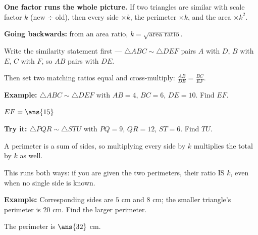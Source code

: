 \documentclass[12pt]{article}
\begin{document}

\begin{formulabox}
\textbf{One factor runs the whole picture.} If two triangles are similar with
scale factor $k$ (new $\div$ old), then every side $\times k$, the perimeter
$\times k$, and the area $\times k^2$.\par
\textbf{Going backwards:} from an area ratio, $k = \sqrt{\text{area ratio}}$.
\end{formulabox}


\begin{formulabox}
Write the similarity statement first --- $\triangle ABC \sim \triangle DEF$
pairs $A$ with $D$, $B$ with $E$, $C$ with $F$, so $AB$ pairs with $DE$.\par
Then set two matching ratios equal and cross-multiply:
$\frac{AB}{DE} = \frac{BC}{EF}$.
\end{formulabox}

\begin{examplebox}
\textbf{Example:} \quad $\triangle ABC \sim \triangle DEF$ with $AB = 4$,
$BC = 6$, $DE = 10$. Find $EF$.

$EF = \ans{15}$
\end{examplebox}

\begin{tryitbox}
\textbf{Try it:} \quad $\triangle PQR \sim \triangle STU$ with $PQ = 9$,
$QR = 12$, $ST = 6$. Find $TU$.\\[2pt]
\end{tryitbox}


\begin{formulabox}
A perimeter is a sum of sides, so multiplying every side by $k$ multiplies the
total by $k$ as well.\par
This runs both ways: if you are given the two perimeters, their ratio IS $k$,
even when no single side is known.
\end{formulabox}

\begin{examplebox}
\textbf{Example:} \quad Corresponding sides are $5$ cm and $8$ cm; the smaller
triangle's perimeter is $20$ cm. Find the larger perimeter.

The perimeter is $\ans{32}$ cm.
\end{examplebox}
\end{document}
